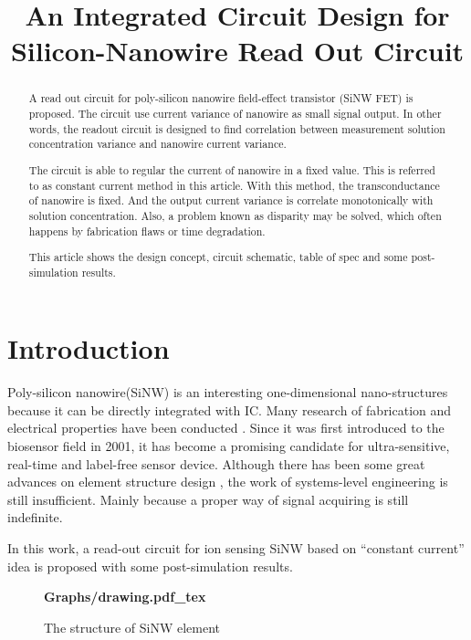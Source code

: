 \documentclass{article}
\title{An Integrated Circuit Design for Silicon-Nanowire Read Out Circuit}
\begin{document}
%
\maketitle
%
\begin{abstract}
A read out circuit for poly-silicon nanowire field-effect transistor (SiNW FET) is proposed.
The circuit use current variance of nanowire as small signal output.
In other words, the readout circuit is designed to find correlation between measurement solution concentration variance and nanowire current variance.

The circuit is able to regular the current of nanowire in a fixed value.
This is referred to as constant current method in this article.
With this method, the transconductance of nanowire is fixed. And the output current variance is correlate monotonically with solution concentration.
Also, a problem known as disparity may be solved, which often happens by fabrication flaws or time degradation.

This article shows the design concept, circuit schematic, table of spec and some post-simulation results.
\end{abstract}
%
\section{Introduction}
\label{sec:intro}

Poly-silicon nanowire(SiNW) is an interesting one-dimensional nano-structures because it can be directly integrated with IC.
Many research of fabrication and electrical properties have been conducted \cite{J1}.
Since it was first introduced to the biosensor field in 2001\cite{J2}, it has become a promising candidate for ultra-sensitive, real-time and label-free  sensor device.
Although there has been some great advances on element structure design \cite{J3}, the work of systems-level engineering is still insufficient.
Mainly because a proper way of signal acquiring is still indefinite.

In this work, a read-out circuit for ion sensing SiNW based on “constant current” idea is proposed with some post-simulation results.



\begin{figure}[b]
    \centering
    {\selectfont \textbf{
        \def\svgwidth{5.0cm}
        \fontsize{6}{7}\selectfont
         {Graphs/drawing.pdf_tex}
        \fontsize{12}{15}\selectfont
    }}
\caption{The structure of SiNW element}
\label{fig:res}
\end{figure}
\end{document}
